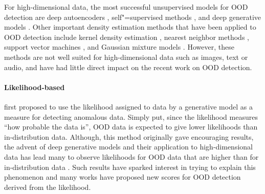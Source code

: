
For high-dimensional data, the most successful unsupervised models for OOD detection are deep autoencoders \parencite{hinton_reducing_2006}, self"=supervised methods \parencite{mikolov_efficient_2013,devlin_bert_2018,schneider_wav2vec_2019,chen_simple_2020}, and deep generative models \parencite{kingma_autoencoding_2014,rezende_stochastic_2014,dinh_nice_2015,rezende_variational_2015,ho_denoising_2020,hinton_fast_2006,oord_conditional_2016,goodfellow_generative_2014}. 
Other important density estimation methods that have been applied to OOD detection include kernel density estimation \parencite{parzen_estimation_1962}, nearest neighbor methods \parencite{cover_nearest_1967}, support vector machines \parencite{cortes_supportvector_1995,scholkopf_estimating_2001}, and Gaussian mixture models \parencite{dempster_maximum_1977}. 
However, these methods are not well suited for high-dimensional data such as images, text or audio, and have had little direct impact on the recent work on OOD detection. 


\paragraph{Likelihood-based}
%
\textcite{bishop_novelty_1994} first proposed to use the likelihood assigned to data by a generative model as a measure for detecting anomalous data. Simply put, since the likelihood measures ``how probable the data is'', OOD data is expected to give lower likelihoods than in-distribution data. Although, this method originally gave encouraging results, the advent of deep generative models and their application to high-dimensional data has lead many to observe likelihoods for OOD data that are higher than for in-distribution data \parencite{choi_waic_2019,nalisnick_detecting_2019,hendrycks_deep_2019,kirichenko_why_2020}. Such results have sparked interest in trying to explain this phenomenon and many works have proposed new scores for OOD detection derived from the likelihood. 

